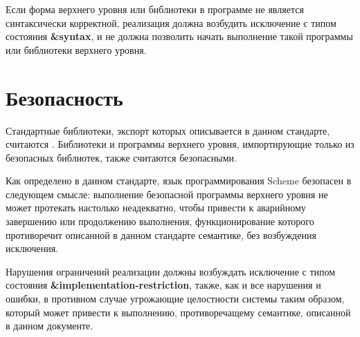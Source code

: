 Если форма верхнего уровня или библиотеки в программе не является синтаксически корректной,
реализация должна возбудить исключение с типом состояния {\bfseries\cf\&syntax}, и не должна
позволить начать выполнение такой программы или библиотеки верхнего уровня.\vspace{-2mm}

\section{Безопасность}\vspace{-1mm}
\label{safetysection}

Стандартные библиотеки, экспорт которых описывается в данном стандарте, считаются
. Библиотеки и программы верхнего уровня, импортирующие
только из безопасных библиотек, также считаются безопасными.

Как определено в данном стандарте, язык программирования Scheme безопасен в следующем смысле:
выполнение безопасной программы верхнего уровня не может протекать настолько неадекватно, чтобы
привести к аварийному завершению или продолжению выполнения, функционирование которого
противоречит описанной в данном стандарте семантике, без возбуждения исключения.

Нарушения ограничений реализации должны возбуждать исключение с типом состояния
{\bfseries\cf\&implementation-\hp{}restriction}, также, как и все нарушения и ошибки, в
противном случае угрожающие целостности системы таким образом, который может привести к
выполнению, противоречащему семантике, описанной в данном документе.

